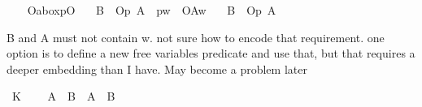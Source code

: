 \begin{isabellebody}
%
\isadelimproof
\ \ %
\endisadelimproof
%
\isatagproof
{}\isamarkupfalse%
%
\endisatagproof
{\isafoldproof}%
%
\isadelimproof
\isanewline
%
\endisadelimproof
{}\isamarkupfalse%
\ Oa{\isacharunderscore}boxpO{\isacharcolon}\isanewline
\ \ \ {\isachardoublequoteopen}{\isasymTurnstile}{\isacharparenleft}B\ \isactrlbold {\isasymrightarrow}\ {\isacharparenleft}{\isacharparenleft}\isactrlbold {\isasymnot}{\isacharparenleft}{\isasymbox}{\isacharparenleft}{\isacharparenleft}O\isactrlsub p\ A{\isacharparenright}\ \isactrlbold {\isasymrightarrow}\ {\isacharparenleft}{\isacharparenleft}{\isasymbox}\isactrlsub pw{\isacharparenright}\ \isactrlbold {\isasymand}\ O{\isacharbraceleft}A{\isacharbar}w{\isacharbraceright}{\isacharparenright}{\isacharparenright}{\isacharparenright}{\isacharparenright}{\isacharparenright}{\isacharparenright}{\isachardoublequoteclose}\isanewline
\ \ \ {\isachardoublequoteopen}{\isasymTurnstile}{\isacharparenleft}B\ \isactrlbold {\isasymrightarrow}\ {\isacharparenleft}\isactrlbold {\isasymnot}{\isacharparenleft}{\isasymdiamond}{\isacharparenleft}O\isactrlsub p\ A{\isacharparenright}{\isacharparenright}{\isacharparenright}{\isacharparenright}{\isachardoublequoteclose}\isanewline
%
\isadelimproof
\ \ %
\endisadelimproof
%
\isatagproof
{}\isamarkupfalse%
\isanewline
%
%
\endisatagproof
{\isafoldproof}%
%
\isadelimproof
%
\endisadelimproof
%
\begin{isamarkuptext}%
B and A must not contain w. not sure how to encode that requirement.
one option is to define a new free variables predicate and use that, but that requires a deeper embedding than I have.
May become a problem later%
\end{isamarkuptext}\isamarkuptrue%
%
\isadelimdocument
%
\endisadelimdocument
%
\isatagdocument
%
\isamarkuptrue%
%
\isamarkuptrue%
%
%
\endisatagdocument
{\isafolddocument}%
%
\isadelimdocument
%
\endisadelimdocument
\isanewline
{}\isamarkupfalse%
\ K{\isacharcolon}\isanewline
\ \ \ {\isachardoublequoteopen}{\isasymTurnstile}\ {\isacharparenleft}{\isacharparenleft}{\isasymbox}{\isacharparenleft}A\ \isactrlbold {\isasymrightarrow}\ B{\isacharparenright}{\isacharparenright}\ \isactrlbold {\isasymrightarrow}\ {\isacharparenleft}{\isacharparenleft}{\isasymbox}A{\isacharparenright}\ \isactrlbold {\isasymrightarrow}\ {\isacharparenleft}{\isasymbox}B{\isacharparenright}{\isacharparenright}{\isacharparenright}{\isachardoublequoteclose}\isanewline

\end{isabellebody}
